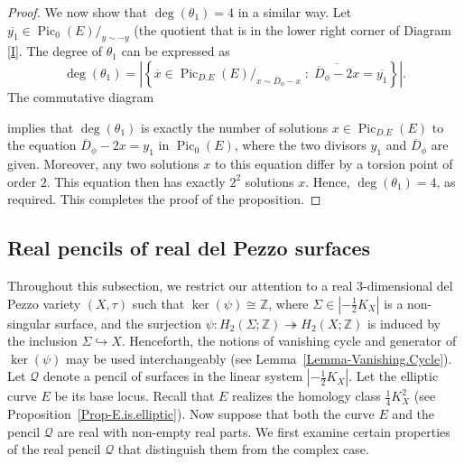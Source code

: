 \documentclass[10pt,a4paper]{article}
\numberwithin{equation}{section}
\theoremstyle{definition}
\theoremstyle{plain}
\theoremstyle{remark}
\newcommand{\Z}{\mathbb{Z}}
\DeclareMathOperator{\Pic}{Pic}
\begin{document}
\begin{proof}
We now show that  $\deg (\theta_1)= 4$ in a similar way. Let $\overline{y_1} \in \Pic_{0} (E)/_{y\sim -y}$ (the quotient that is in the lower right corner of Diagram \eqref{I}. The degree of $\theta_1$ can be expressed as
$$\deg(\theta_1)=\left|\left\{\overline{x}\in \Pic_{D.E} (E)/_{x\sim \overline{D}_{\phi} -x} \; : \; \overline{ \overline{D}_{\phi}-2x}=\overline{ y_1}\right\}\right|.$$
The commutative diagram
\begin{center}
\end{center}
implies that $\deg(\theta_1)$ is exactly the number of solutions $x\in \Pic_{D.E}(E)$ to the equation $\overline{D}_{\phi}-2x=y_1$ in $\Pic_0(E)$, where the two divisors $y_1$ and $\overline{D}_{\phi}$ are given. Moreover, any two solutions $x$ to this equation differ by a torsion point of order $2$. This equation then has exactly $2^2$ solutions $x$.  Hence, $\deg(\theta_1)=4$, as required.
This completes the proof of the proposition.
\end{proof}

\subsection{Real pencils of real del Pezzo surfaces}
Throughout this subsection,  we restrict our attention to a real $3$-dimensional del Pezzo variety $(X,\tau)$  such that $\ker(\psi) \cong \Z$, where $\Sigma \in |-\frac{1}{2}K_X|$ is a non-singular surface, and the surjection $\psi\colon  H_2(\Sigma;\mathbb{Z})	\twoheadrightarrow H_2(X;\mathbb{Z})$ is induced by the inclusion $\Sigma\hookrightarrow X$. Henceforth, the notions of vanishing cycle and generator of $\ker (\psi)$ may be used interchangeably (see Lemma~\ref{Lemma-Vanishing.Cycle}). Let $\mathcal{Q}$ denote a pencil of surfaces in the linear system $|-\frac{1}{2}K_X|$. Let the elliptic curve $E$ be its base locus. Recall that $E$ realizes the homology class $\frac{1}{4}K_X^2$ (see Proposition~\ref{Prop-E.is.elliptic}). Now suppose  that both the curve $E$ and the pencil $\mathcal{Q}$ are real with non-empty real parts. We first examine certain properties of the real pencil $\mathcal{Q}$ that distinguish them from the complex case.
\end{document}
